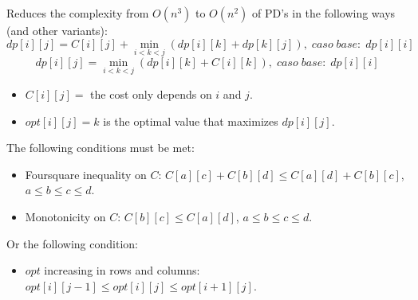 Reduces the complexity from $O(n^3)$ to $O(n^2)$ of PD's in the following ways (and other variants):
\begin{equation}
  dp[i][j] = C[i][j] + \min_{i < k < j}(dp[i][k] + dp[k][j]), \; caso \; base: \; dp[i][i]
\end{equation}
\begin{equation}
  dp[i][j] = \min_{i < k < j}(dp[i][k] + C[i][k]), \; caso \; base: \; dp[i][i]
\end{equation}
\begin{itemize}
  \itemsep0em
  \item $C[i][j] =$ the cost only depends on $i$ and $j$.
  \item $opt[i][j] = k$ is the optimal value that maximizes $dp[i][j]$.
\end{itemize}
The following conditions must be met:
\begin{itemize}
  \itemsep0em
  \item Foursquare inequality on $C$: $C[a][c] + C[b][d] \leq C[a][d] + C[b][c]$, $a \leq b \leq c \leq d$.
  \item Monotonicity on $C$: $C[b][c] \leq C[a][d]$, $a \leq b \leq c \leq d$.
\end{itemize}
Or the following condition:
\begin{itemize}
  \itemsep0em
  \item $opt$ increasing in rows and columns: $opt[i][j-1] \leq opt[i][j] \leq opt[i+1][j]$.
\end{itemize}

